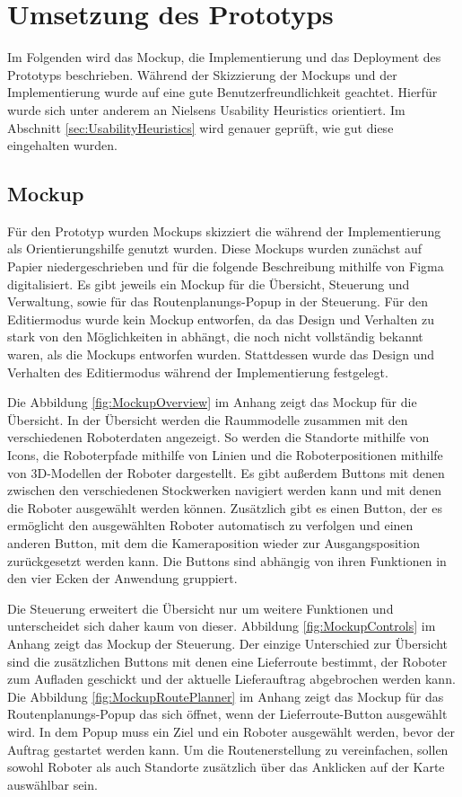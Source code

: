\newpage
\section{Umsetzung des Prototyps}\label{sec:RealizationOfPrototype}
Im Folgenden wird das \gls{Mockup}, die Implementierung und das Deployment des Prototyps beschrieben. Während der Skizzierung der \gls{Mockup}s und der Implementierung wurde auf eine gute Benutzerfreundlichkeit geachtet. Hierfür wurde sich unter anderem an Nielsens Usability Heuristics \cite{Nielsen.1994} orientiert. Im Abschnitt \ref{sec:UsabilityHeuristics} wird genauer geprüft, wie gut diese eingehalten wurden.

\subsection{Mockup}\label{sec:Mockup}
Für den Prototyp wurden \gls{Mockup}s skizziert die während der Implementierung als Orientierungshilfe genutzt wurden. Diese \gls{Mockup}s wurden zunächst auf Papier niedergeschrieben und für die folgende Beschreibung mithilfe von Figma \cite{Figma} digitalisiert. Es gibt jeweils ein \gls{Mockup} für die Übersicht, Steuerung und Verwaltung, sowie für das Routenplanungs-Popup in der Steuerung. Für den Editiermodus wurde kein \gls{Mockup} entworfen, da das Design und Verhalten zu stark von den Möglichkeiten in \deckgl{} abhängt, die noch nicht vollständig bekannt waren, als die \gls{Mockup}s entworfen wurden. Stattdessen wurde das Design und Verhalten des Editiermodus während der Implementierung festgelegt.

Die Abbildung \ref{fig:MockupOverview} im Anhang zeigt das \gls{Mockup} für die Übersicht. In der Übersicht werden die Raummodelle zusammen mit den verschiedenen Roboterdaten angezeigt. So werden die Standorte mithilfe von Icons, die Roboterpfade mithilfe von Linien und die Roboterpositionen mithilfe von 3D-Modellen der Roboter dargestellt. Es gibt außerdem Buttons mit denen zwischen den verschiedenen Stockwerken navigiert werden kann und mit denen die Roboter ausgewählt werden können. Zusätzlich gibt es einen Button, der es ermöglicht den ausgewählten Roboter automatisch zu verfolgen und einen anderen Button, mit dem die Kameraposition wieder zur Ausgangsposition zurückgesetzt werden kann. Die Buttons sind abhängig von ihren Funktionen in den vier Ecken der Anwendung gruppiert.

Die Steuerung erweitert die Übersicht nur um weitere Funktionen und unterscheidet sich daher kaum von dieser. Abbildung \ref{fig:MockupControls} im Anhang zeigt das \gls{Mockup} der Steuerung. Der einzige Unterschied zur Übersicht sind die zusätzlichen Buttons mit denen eine Lieferroute bestimmt, der Roboter zum Aufladen geschickt und der aktuelle Lieferauftrag abgebrochen werden kann. Die Abbildung \ref{fig:MockupRoutePlanner} im Anhang zeigt das \gls{Mockup} für das Routenplanungs-Popup das sich öffnet, wenn der Lieferroute-Button ausgewählt wird. In dem Popup muss ein Ziel und ein Roboter ausgewählt werden, bevor der Auftrag gestartet werden kann. Um die Routenerstellung zu vereinfachen, sollen sowohl Roboter als auch Standorte zusätzlich über das Anklicken auf der Karte auswählbar sein.

